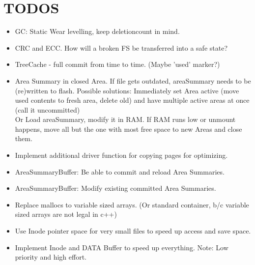 \appendix
\section{TODOS}
\begin{itemize}
	\item GC: Static Wear levelling, keep deletioncount in mind.
	\item CRC and ECC. How will a broken FS be transferred into a safe state?
	\item TreeCache - full commit from time to time. (Maybe 'used' marker?)
	\item Area Summary in closed Area. If file gets outdated, areaSummary needs to be (re)written to flash. Possible solutions: 
		Immediately set Area active (move used contents to fresh area, delete old) and have multiple active areas at once (call it uncommitted)\\
		Or Load areaSummary, modify it in RAM. If RAM runs low or unmount happens, move all but the one with most free space to new Areas and close them.
	\item Implement additional driver function for copying pages for optimizing.
	\item AreaSummaryBuffer: Be able to commit and reload Area Summaries.
	\item AreaSummaryBuffer: Modify existing committed Area Summaries.\textbf{}
	\item Replace mallocs to variable sized arrays. (Or standard container, b/c variable sized arrays are not legal in c++)
	
	\item Use Inode pointer space for very small files to speed up access and save space.
	\item Implement Inode and DATA Buffer to speed up everything. Note: Low priority and high effort.
\end{itemize}